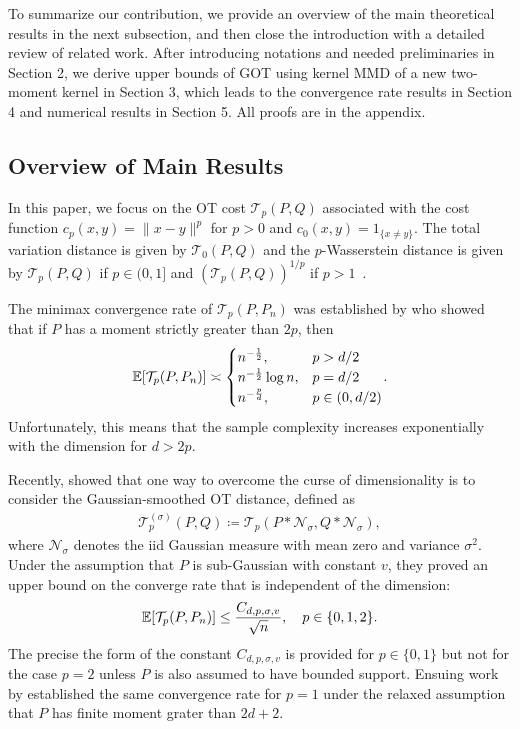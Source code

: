 \documentclass{article}
\theoremstyle{definition}
\newcommand{\ex}[1]{\ensuremath{\mathbb{E}\left[ #1\right]}}
\newcommand{\normal}{\mathcal{N}}
\newcommand{\cN}{\mathcal{N}}
\newcommand{\cT}{\mathcal{T}}
\newcommand{\appnamesmall}{appendix}
\newcommand{\appnamesmall}{supplementary materials}
\let\originalleft\left
\let\originalright\right
\renewcommand{\left}{\mathopen{}\mathclose\bgroup\originalleft}
\renewcommand{\right}{\aftergroup\egroup\originalright}
\begin{document}
To summarize our contribution, we provide an overview of the main theoretical results in the next subsection, and then close the introduction with a  detailed review of related work. After introducing notations and needed preliminaries in Section 2,
we derive upper bounds of GOT using kernel MMD of a new two-moment kernel in Section 3,
which leads to the convergence rate results in Section 4 and numerical results in Section 5. All proofs are in the \appnamesmall.


 
\subsection{Overview of Main Results} 
 
In this paper, we focus on the OT cost $\cT_p(P,Q)$ associated with the cost function $c_p(x,y) = \|x- y\|^p$ for $p > 0$ and $c_0(x,y)= 1_{\{x \ne y\}}$. The total variation distance is given by  $\cT_0(P,Q)$ and the $p$-Wasserstein distance is given by $\cT_p(P,Q)$ if $p \in (0,1]$ and $(\cT_p(P,Q))^{1/p}$ if $p > 1$~\cite{villani2003topics}.


The minimax convergence rate of $\cT_p(P,P_n)$ was established by 
\cite[Theorem~1]{fournier:2015} who showed that if $P$ has a moment strictly greater than $2p$, then  
\begin{align}  
    \ex{ \cT_{p} (P, P_n) } \asymp  \begin{cases} n^{-\frac{1}{2}}, & p > d/2\\
    n^{-\frac{1}{2}} \log n , & p = d/2\\
    n^{- \frac{p}{d}},  & p \in (0,  d/2)
    \end{cases}. \label{eq_Tp_rate}
\end{align}
Unfortunately, this means that the sample complexity increases exponentially with the dimension for $d > 2p$.

Recently, \cite{goldfeld:2020b} showed that one way to overcome the curse of dimensionality is to consider the Gaussian-smoothed OT distance, defined as
\begin{align*}
    \cT_p^{(\sigma)}(P,Q) \coloneqq  \cT_p( P \ast \normal_\sigma, Q \ast \normal_\sigma),
\end{align*}
 where $\cN_\sigma$ denotes the iid Gaussian measure with mean zero and variance $\sigma^2$. Under the assumption that $P$ is sub-Gaussian with constant $v$, they proved an upper bound on the converge rate that is independent of the dimension:
 \begin{align*}
\ex{ \cT_{p} (P, P_n) } \le \frac{C_{d,p,\sigma,v}}{\sqrt{n}}, \quad p \in \{0,1,2\}.
\end{align*}
The precise the form of the constant $C_{d,p,\sigma,v}$ is provided for $p \in \{0,1\}$ but not for the case $p =2$ unless $P$ is also assumed to have bounded support.
Ensuing work by \cite{goldfeld2020asymptotic} established the same convergence rate for $p=1$ under the relaxed assumption that $P$ has finite moment grater than $2d + 2$. 
\end{document}
